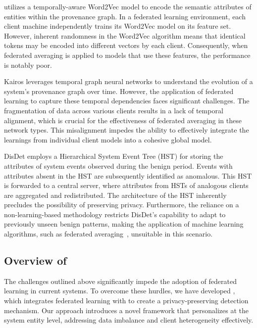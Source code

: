  \flash utilizes a temporally-aware Word2Vec model to encode the semantic attributes of entities within the provenance graph. In a federated learning environment, each client machine independently trains its Word2Vec model on its feature set. However, inherent randomness in the Word2Vec algorithm means that identical tokens may be encoded into different vectors by each client. Consequently, when federated averaging is applied to \gnn models that use these features, the performance is notably poor.

 Kairos leverages temporal graph neural networks to understand the evolution of a system's provenance graph over time. However, the application of federated learning to capture these temporal dependencies faces significant challenges. The fragmentation of data across various clients results in a lack of temporal alignment, which is crucial for the effectiveness of federated averaging in these network types. This misalignment impedes the ability to effectively integrate the learnings from individual client models into a cohesive global model.

 DisDet employs a Hierarchical System Event Tree (HST) for storing the attributes of system events observed during the benign period. Events with attributes absent in the HST are subsequently identified as anomalous. This HST is forwarded to a central server, where attributes from HSTs of analogous clients are aggregated and redistributed. The architecture of the HST inherently precludes the possibility of preserving privacy. Furthermore, the reliance on a non-learning-based methodology restricts DisDet's capability to adapt to previously unseen benign patterns, making the application of machine learning algorithms, such as federated averaging~\cite{mcmahan2017communication}, unsuitable in this scenario.


\subsection{Overview of \Sys}
The challenges outlined above significantly impede the adoption of federated learning in current systems. To overcome these hurdles, we have developed \Sys, which integrates federated learning with \grl to create a privacy-preserving detection mechanism. Our approach introduces a novel framework that personalizes \grl at the system entity level, addressing data imbalance and client heterogeneity effectively.

